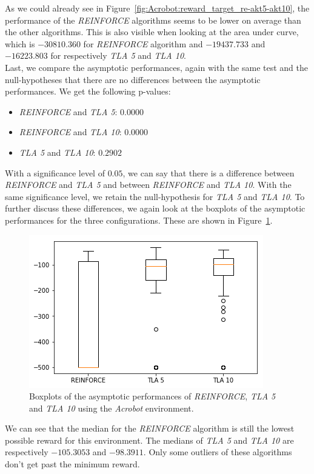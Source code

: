 As we could already see in Figure~\ref{fig:Acrobot:reward_target_re-akt5-akt10}, the performance of the \textit{REINFORCE} algorithms seems to be lower on average than the other algorithms. This is also visible when looking at the area under curve, which is $-30810.360$ for \textit{REINFORCE} algorithm and $-19437.733$ and $-16223.803$ for respectively \textit{TLA 5} and \textit{TLA 10}.\\

Last, we compare the asymptotic performances, again with the same test and the null-hypotheses that there are no differences between the asymptotic performances. We get the following p-values:
\begin{itemize}
    \item \textit{REINFORCE} and \textit{TLA 5}: $0.0000$
    \item \textit{REINFORCE} and \textit{TLA 10}: $0.0000$
    \item \textit{TLA 5} and \textit{TLA 10}: $0.2902$
\end{itemize}
With a significance level of $0.05$, we can say that there is a difference between \textit{REINFORCE} and \textit{TLA 5} and between \textit{REINFORCE} and \textit{TLA 10}. With the same significance level, we retain the null-hypothesis for \textit{TLA 5} and \textit{TLA 10}. To further discuss these differences, we again look at the boxplots of the asymptotic performances for the three configurations. These are shown in Figure~\ref{fig:Acrobot:asymp_target_re-akt5-akt10}.
\begin{figure}[htb]
    \centering
    \includegraphics[width=\linewidth]{images/results/Acrobot/no_sparse_transfer/asymp_target_re-akt5-akt10.png}
    \caption{Boxplots of the asymptotic performances of \textit{REINFORCE}, \textit{TLA 5} and \textit{TLA 10} using the \textit{Acrobot} environment.}
    \label{fig:Acrobot:asymp_target_re-akt5-akt10}
\end{figure}
We can see that the median for the \textit{REINFORCE} algorithm is still the lowest possible reward for this environment. The medians of \textit{TLA 5} and \textit{TLA 10} are respectively $-105.3053$ and $-98.3911$. Only some outliers of these algorithms don't get past the minimum reward.

